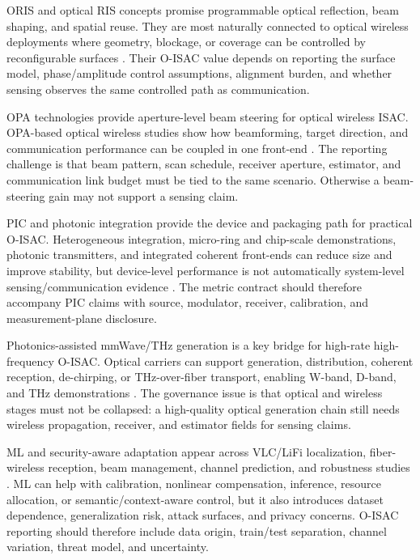 \documentclass[letterpaper,journal]{IEEEtran}
\begin{document}
ORIS and optical RIS concepts promise programmable optical reflection, beam shaping, and spatial reuse. They are most naturally connected to optical wireless deployments where geometry, blockage, or coverage can be controlled by reconfigurable surfaces \cite{O_ISAC_112,O_ISAC_145,O_ISAC_156,O_ISAC_163,O_ISAC_200}. Their O-ISAC value depends on reporting the surface model, phase/amplitude control assumptions, alignment burden, and whether sensing observes the same controlled path as communication.

OPA technologies provide aperture-level beam steering for optical wireless ISAC. OPA-based optical wireless studies show how beamforming, target direction, and communication performance can be coupled in one front-end \cite{O_ISAC_008,O_ISAC_061,O_ISAC_091,O_ISAC_120}. The reporting challenge is that beam pattern, scan schedule, receiver aperture, estimator, and communication link budget must be tied to the same scenario. Otherwise a beam-steering gain may not support a sensing claim.

PIC and photonic integration provide the device and packaging path for practical O-ISAC. Heterogeneous integration, micro-ring and chip-scale demonstrations, photonic transmitters, and integrated coherent front-ends can reduce size and improve stability, but device-level performance is not automatically system-level sensing/communication evidence \cite{O_ISAC_036,O_ISAC_045,O_ISAC_063,O_ISAC_073,O_ISAC_354,O_ISAC_360}. The metric contract should therefore accompany PIC claims with source, modulator, receiver, calibration, and measurement-plane disclosure.

Photonics-assisted mmWave/THz generation is a key bridge for high-rate high-frequency O-ISAC. Optical carriers can support generation, distribution, coherent reception, de-chirping, or THz-over-fiber transport, enabling W-band, D-band, and THz demonstrations \cite{O_ISAC_026,O_ISAC_029,O_ISAC_031,O_ISAC_043,O_ISAC_044,O_ISAC_047,O_ISAC_057,O_ISAC_065,O_ISAC_070,O_ISAC_077}. The governance issue is that optical and wireless stages must not be collapsed: a high-quality optical generation chain still needs wireless propagation, receiver, and estimator fields for sensing claims.

ML and security-aware adaptation appear across VLC/LiFi localization, fiber-wireless reception, beam management, channel prediction, and robustness studies \cite{O_ISAC_017,O_ISAC_039,O_ISAC_098,O_ISAC_103,O_ISAC_127,O_ISAC_134,O_ISAC_138,O_ISAC_140,O_ISAC_242,O_ISAC_379}. ML can help with calibration, nonlinear compensation, inference, resource allocation, or semantic/context-aware control, but it also introduces dataset dependence, generalization risk, attack surfaces, and privacy concerns. O-ISAC reporting should therefore include data origin, train/test separation, channel variation, threat model, and uncertainty.
\end{document}
